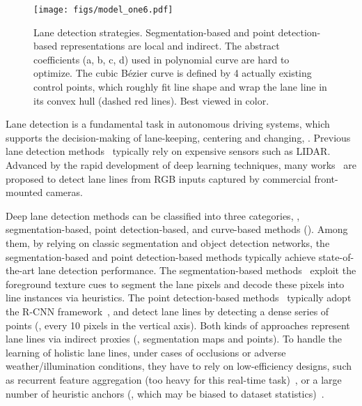 \documentclass[10pt,twocolumn,letterpaper]{article}
\begin{document}
\begin{figure}[t]
    \centering
    \texttt{[image: figs/model\_one6.pdf]}
    \vspace{-3mm}
    \caption{Lane detection strategies. Segmentation-based and point detection-based representations are local and indirect. The abstract coefficients (a, b, c, d) used in polynomial curve are hard to optimize.
    The cubic Bézier curve is defined by 4 actually existing control points, which roughly fit line shape and wrap the lane line in its convex hull (dashed red lines). Best viewed in color.}
    \label{fig:modeling}
    \vspace{-3mm}
\end{figure}





Lane detection is a fundamental task in autonomous driving systems, which supports the decision-making of lane-keeping, centering and changing, \etc.
Previous lane detection methods~\cite{badue2021self,hillel2014recent} typically rely on expensive sensors such as LIDAR.
Advanced by the rapid development of deep learning techniques, many works~\cite{pan2018spatial,neven2018towards,zheng2021resa,tabelini2021keep,liu2021end} are proposed to detect lane lines from RGB inputs captured by commercial front-mounted cameras.



Deep lane detection methods can be classified into three categories, \ie, segmentation-based, point detection-based, and curve-based methods ().
Among them, by relying on classic segmentation \cite{deeplabv1} and object detection \cite{ren2015faster} networks, the segmentation-based and point detection-based methods typically achieve state-of-the-art lane detection performance.
The segmentation-based methods~\cite{pan2018spatial,zheng2021resa,neven2018towards} exploit the foreground texture cues to segment the lane pixels and decode these pixels into line instances via heuristics.
The point detection-based methods~\cite{li2019line,tabelini2021keep,xu2020curvelane} typically adopt the R-CNN framework~\cite{girshick2015fast,ren2015faster}, and detect lane lines by detecting a dense series of points (\eg, every 10 pixels in the vertical axis).
Both kinds of approaches represent lane lines via indirect proxies (\ie, segmentation maps and points).
To handle the learning of holistic lane lines, under cases of occlusions or adverse weather/illumination conditions, they have to rely on low-efficiency designs, such as recurrent feature aggregation (too heavy for this real-time task)~\cite{pan2018spatial,zheng2021resa}, or a large number of heuristic anchors (, which may be biased to dataset statistics)~\cite{tabelini2021keep}. 
\end{document}

